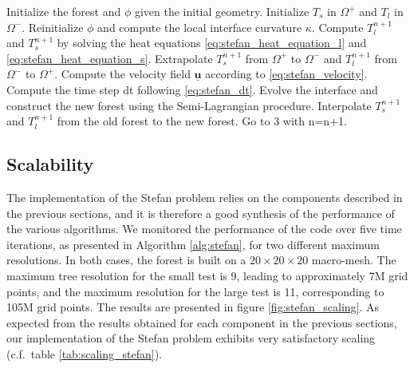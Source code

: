 \begin{algorithm}[htbp]
\caption{$\texttt{General procedure for solving the Stefan problem}$}
\begin{algorithmic}[1]
\State Initialize the forest and $\phi$ given the initial geometry.
\State Initialize $T_s$ in $\Omega^+$ and $T_l$ in $\Omega^-$.
\State Reinitialize $\phi$ and compute the local interface curvature $\kappa$.
\State Compute $T^{n+1}_l$ and $T^{n+1}_s$ by solving the heat equations \eqref{eq:stefan_heat_equation_l} and \eqref{eq:stefan_heat_equation_s}.
\State Extrapolate $T^{n+1}_s$ from $\Omega^+$ to $\Omega^-$ and $T^{n+1}_l$ from $\Omega^-$ to $\Omega^+$.
\State Compute the velocity field $\underline{\mathbf{u}}$ according to \eqref{eq:stefan_velocity}.
\State Compute the time step dt following \eqref{eq:stefan_dt}.
\State Evolve the interface and construct the new forest using the Semi-Lagrangian procedure.
\State Interpolate $T^{n+1}_s$ and $T^{n+1}_l$ from the old forest to the new forest.
\State Go to 3 with n=n+1.
\end{algorithmic}
\label{alg:stefan}
\end{algorithm}

\subsection{Scalability}

The implementation of the Stefan problem relies on the components described in the previous sections, and it is therefore a good synthesis of the performance of the various algorithms. We monitored the performance of the code over five time iterations, as presented in Algorithm \ref{alg:stefan}, for two different maximum resolutions. In both cases, the forest is built on a $20\times20\times20$ macro-mesh. The maximum tree resolution for the small test is 9, leading to approximately 7M grid points, and the maximum resolution for the large test is 11, corresponding to 105M grid points. The results are presented in figure \ref{fig:stefan_scaling}. As expected from the results obtained for each component in the previous sections, our implementation of the Stefan problem exhibits very satisfactory scaling (c.f.\ table \ref{tab:scaling_stefan}).

